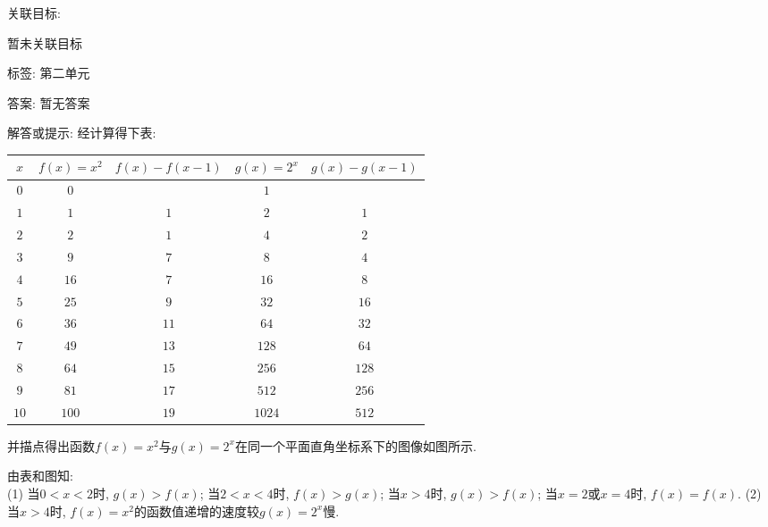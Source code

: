 \documentclass[10pt,a4paper]{article}
\begin{document}
\begin{enumerate}[1.]
关联目标:

暂未关联目标



标签: 第二单元

答案: 暂无答案

解答或提示: 经计算得下表:
\begin{center}
    \begin{tabular}{|c|c|c|c|c|}
        \hline
        $x$	 & $f(x)=x^2$ & $f(x)-f(x-1)$ & $g(x)=2^x$ & $g(x)-g(x-1)$ \\ \hline
        $0$ & $0$ &  & $1$ & \\ \hline 
        $1$ & $1$ & $1$ & $2$ & $1$ \\  \hline 
        $2$ & $2$ & $1$ & $4$ & $2$\\  \hline 
        $3$ & $9$ & $7$ & $8$ & $4$\\  \hline 
        $4$ & $16$ & $7$ & $16$ & $8$\\  \hline 
        $5$ & $25$ & $9$ & $32$ & $16$\\ \hline 
        $6$ & $36$ & $11$ & $64$ & $32$\\  \hline 
        $7$ & $49$ & $13$ & $128$ & $64$\\ \hline
        $8$ & $64$ & $15$ & $256$ & $128$\\  \hline 
        $9$ & $81$ & $17$ & $512$ & $256$\\  \hline 
        $10$ & $100$ & $19$ & $1024$ & $512$\\ \hline
    \end{tabular}
\end{center}
并描点得出函数$f(x)=x^2$与$g(x)=2^x$在同一个平面直角坐标系下的图像如图所示.
\begin{center}
\end{center}
由表和图知:\\
(1) 当$0<x<2$时, $g(x)>f(x)$; 当$2<x<4$时, $f(x)>g(x)$; 当$x>4$时, $g(x)>f(x)$; 当$x=2$或$x=4$时, $f(x)=f(x)$.
(2) 当$x>4$时, $f(x)=x^2$的函数值递增的速度较$g(x)=2^x$慢.


\end{enumerate}
\end{document}

